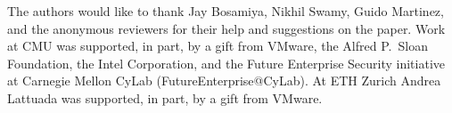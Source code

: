 
\begin{acks}                            %
  The authors would like to thank Jay Bosamiya, Nikhil Swamy, Guido Martinez,
  and the anonymous reviewers
  for their help and suggestions on the paper.
  Work at CMU was supported, in part, by a gift from VMware, 
  the Alfred P.\ Sloan Foundation, the Intel Corporation,
  and the Future Enterprise Security initiative at Carnegie Mellon CyLab (FutureEnterprise@CyLab).
  At ETH Zurich Andrea Lattuada was supported, in part, by a gift from VMware.
\end{acks}

